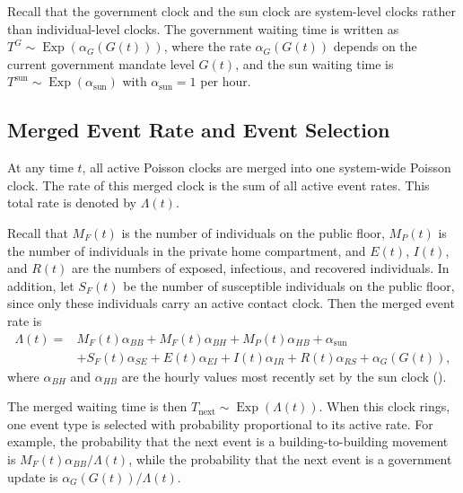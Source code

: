 \documentclass[11pt]{article}
\theoremstyle{definition}
\theoremstyle{plain}
\begin{document}
Recall that the government clock and the sun clock are system-level clocks rather than individual-level clocks. The government waiting time is written as $T^{G}\sim \operatorname{Exp}(\alpha_G(G(t)))$, where the rate $\alpha_G(G(t))$ depends on the current government mandate level $G(t)$, and the sun waiting time is $T^{\mathrm{sun}}\sim\operatorname{Exp}(\alpha_{\mathrm{sun}})$ with $\alpha_{\mathrm{sun}}=1$ per hour.

\subsection{Merged Event Rate and Event Selection}
\label{sec:merged}

At any time $t$, all active Poisson clocks are merged into one system-wide Poisson clock. The rate of this merged clock is the sum of all active event rates. This total rate is denoted by $\Lambda(t)$.

Recall that $M_F(t)$ is the number of individuals on the public floor, $M_P(t)$ is the number of individuals in the private home compartment, and $E(t)$, $I(t)$, and $R(t)$ are the numbers of exposed, infectious, and recovered individuals. In addition, let $S_F(t)$ be the number of susceptible individuals on the public floor, since only these individuals carry an active contact clock. Then the merged event rate is
\begin{equation}\label{eq:Lambda}
\begin{aligned}
\Lambda(t)
={}&
M_F(t)\alpha_{BB}
+
M_F(t)\alpha_{BH}
+
M_P(t)\alpha_{HB}
+
\alpha_{\mathrm{sun}}
\\
&+
S_F(t)\alpha_{SE}
+
E(t)\alpha_{EI}
+
I(t)\alpha_{IR}
+
R(t)\alpha_{RS}
+
\alpha_G(G(t)),
\end{aligned}
\end{equation}
where $\alpha_{BH}$ and $\alpha_{HB}$ are the hourly values most recently set by the sun clock ().


The merged waiting time is then $T_{\text{next}}\sim \operatorname{Exp}(\Lambda(t))$. When this clock rings, one event type is selected with probability proportional to its active rate. For example, the probability that the next event is a building-to-building movement is $M_F(t)\alpha_{BB}/\Lambda(t)$, while the probability that the next event is a government update is $\alpha_G(G(t))/\Lambda(t)$.
\end{document}
